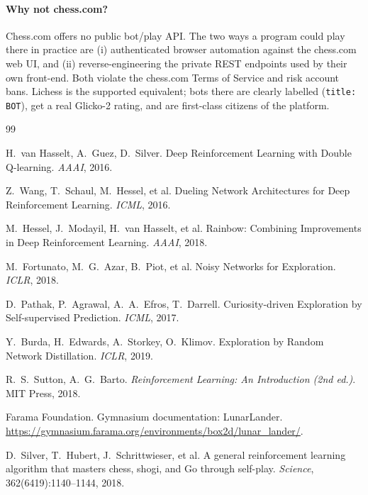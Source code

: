 \documentclass[11pt,a4paper]{article}
\begin{document}
\paragraph{Why not chess.com?} Chess.com offers no public bot/play
API. The two ways a program could play there in practice are
(i) authenticated browser automation against the chess.com web UI,
and (ii) reverse-engineering the private REST endpoints used by their
own front-end. Both violate the chess.com Terms of Service and risk
account bans. Lichess is the supported equivalent; bots there are
clearly labelled (\texttt{title: BOT}), get a real Glicko-2 rating,
and are first-class citizens of the platform.

\newpage
\begin{thebibliography}{99}\small

H.\ van Hasselt, A.\ Guez, D.\ Silver.
\newblock Deep Reinforcement Learning with Double Q-learning.
\newblock \emph{AAAI}, 2016.

Z.\ Wang, T.\ Schaul, M.\ Hessel, et al.
\newblock Dueling Network Architectures for Deep Reinforcement Learning.
\newblock \emph{ICML}, 2016.

M.\ Hessel, J.\ Modayil, H.\ van Hasselt, et al.
\newblock Rainbow: Combining Improvements in Deep Reinforcement Learning.
\newblock \emph{AAAI}, 2018.

M.\ Fortunato, M.\ G.\ Azar, B.\ Piot, et al.
\newblock Noisy Networks for Exploration.
\newblock \emph{ICLR}, 2018.

D.\ Pathak, P.\ Agrawal, A.\ A.\ Efros, T.\ Darrell.
\newblock Curiosity-driven Exploration by Self-supervised Prediction.
\newblock \emph{ICML}, 2017.

Y.\ Burda, H.\ Edwards, A.\ Storkey, O.\ Klimov.
\newblock Exploration by Random Network Distillation.
\newblock \emph{ICLR}, 2019.

R.\ S.\ Sutton, A.\ G.\ Barto.
\newblock \emph{Reinforcement Learning: An Introduction (2nd ed.)}.
\newblock MIT Press, 2018.

Farama Foundation.
\newblock Gymnasium documentation: LunarLander.
\newblock \url{https://gymnasium.farama.org/environments/box2d/lunar_lander/}.

D.\ Silver, T.\ Hubert, J.\ Schrittwieser, et al.
\newblock A general reinforcement learning algorithm that masters chess,
shogi, and Go through self-play.
\newblock \emph{Science}, 362(6419):1140--1144, 2018.


\end{thebibliography}
\end{document}
